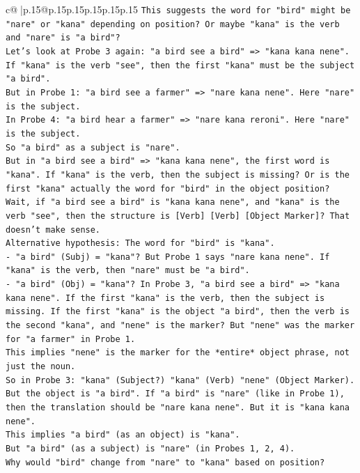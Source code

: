 \documentclass{article}
\begin{document}
{\begin{supertabular}{c@{$\;$}|p{.15\linewidth}@{}p{.15\linewidth}p{.15\linewidth}p{.15\linewidth}p{.15\linewidth}p{.15\linewidth}}
{{{\texttt{This suggests the word for "bird" might be "nare" or "kana" depending on position? Or maybe "kana" is the verb and "nare" is "a bird"?} \\
\texttt{Let's look at Probe 3 again: "a bird see a bird" => "kana kana nene".} \\
\texttt{If "kana" is the verb "see", then the first "kana" must be the subject "a bird".} \\
\texttt{But in Probe 1: "a bird see a farmer" => "nare kana nene". Here "nare" is the subject.} \\
\texttt{In Probe 4: "a bird hear a farmer" => "nare kana reroni". Here "nare" is the subject.} \\
\texttt{So "a bird" as a subject is "nare".} \\
\texttt{But in "a bird see a bird" => "kana kana nene", the first word is "kana". If "kana" is the verb, then the subject is missing? Or is the first "kana" actually the word for "bird" in the object position?} \\
\texttt{Wait, if "a bird see a bird" is "kana kana nene", and "kana" is the verb "see", then the structure is {[}Verb{]} {[}Verb{]} {[}Object Marker{]}? That doesn't make sense.} \\
\texttt{Alternative hypothesis: The word for "bird" is "kana".} \\
\texttt{{-} "a bird" (Subj) = "kana"? But Probe 1 says "nare kana nene". If "kana" is the verb, then "nare" must be "a bird".} \\
\texttt{{-} "a bird" (Obj) = "kana"? In Probe 3, "a bird see a bird" => "kana kana nene". If the first "kana" is the verb, then the subject is missing. If the first "kana" is the object "a bird", then the verb is the second "kana", and "nene" is the marker? But "nene" was the marker for "a farmer" in Probe 1.} \\
\texttt{This implies "nene" is the marker for the *entire* object phrase, not just the noun.} \\
\texttt{So in Probe 3: "kana" (Subject?) "kana" (Verb) "nene" (Object Marker). But the object is "a bird". If "a bird" is "nare" (like in Probe 1), then the translation should be "nare kana nene". But it is "kana kana nene".} \\
\texttt{This implies "a bird" (as an object) is "kana".} \\
\texttt{But "a bird" (as a subject) is "nare" (in Probes 1, 2, 4).} \\
\texttt{Why would "bird" change from "nare" to "kana" based on position?} \\
}}}
\end{supertabular}}
\end{document}
